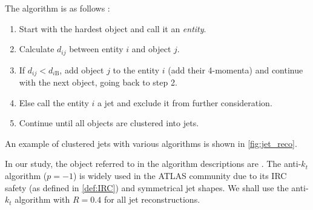 The algorithm is as follows \cite{antikt}:
\begin{enumerate}
    \item Start with the hardest object and call it an \emph{entity}.
    \item Calculate $d_{ij}$ between entity $i$ and object $j$.
    \item If $d_{ij} < d_{i\text{B}}$, add object $j$ to the entity $i$ (add their 4-momenta) and continue with the next object, going back to step 2.
    \item Else call the entity $i$ a jet and exclude it from further consideration.
    \item Continue until all objects are clustered into jets.
\end{enumerate}
An example of clustered jets with various algorithms is shown in \cref{fig:jet_reco}.

In our study, the object referred to in the algorithm descriptions are \PFOs.
The anti-$k_t$ algorithm ($p=-1$) is widely used in the ATLAS community due to its IRC safety (as defined in \cref{def:IRC}) and symmetrical jet shapes. 
We shall use the anti-$k_t$ algorithm with $R=0.4$ for all jet reconstructions.

